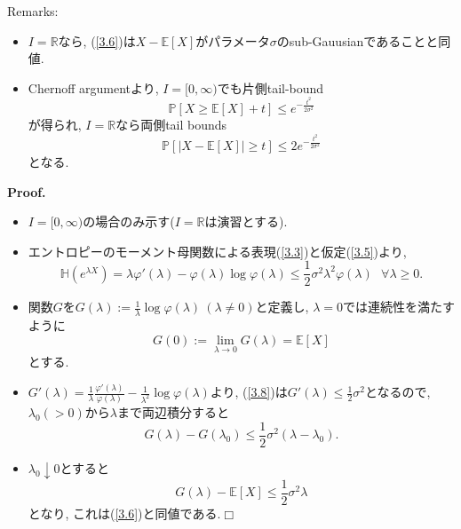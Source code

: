 \documentclass[aspectratio=169, dvipdfmx]{beamer}
\def\qed{\hfill $\Box$}
\newcommand{\ex}{\mathbb{E}}
\begin{document}
\begin{frame}{}
Remarks:
\begin{itemize}
    \item $I = \mathbb{R}$なら, (\ref{3.6})は$X-\ex[X]$がパラメータ$\sigma$のsub-Gauusianであることと同値.
    \item Chernoff argumentより, $I = [0, \infty)$でも片側tail-bound
    \[ \mathbb{P}[X \ge \ex[X]+t] \le e^{-\frac{t^2}{2\sigma^2}} \tag{3.7}\label{3.7}\]
    が得られ, $I=\mathbb{R}$なら両側tail bounds
    \[ \mathbb{P}[|X-\ex[X]|\ge t] \le 2e^{-\frac{t^2}{2\sigma^2}}\]
    となる.
\end{itemize}
\end{frame}

\begin{frame}{}{} 
{\bf Proof.}
\begin{itemize}
    \item $I = [0,\infty)$の場合のみ示す($I=\mathbb{R}$は演習とする).
    \item エントロピーのモーメント母関数による表現(\ref{3.3})と仮定(\ref{3.5})より,
    \[\mathbb{H}(e^{\lambda X}) = \lambda \varphi'(\lambda) - \varphi(\lambda)\log\varphi(\lambda)\le\frac{1}{2}\sigma^2\lambda^2\varphi(\lambda) \ \ \ \forall \lambda \ge 0.\tag{3.8}\label{3.8} \]
    \item 関数$G$を$G(\lambda):= \frac{1}{\lambda}\log\varphi(\lambda)\ (\lambda\ne 0)$と定義し, $\lambda=0$では連続性を満たすように
    \[ G(0):= \lim_{\lambda \to 0}G(\lambda) = \ex[X] \tag{3.9}\label{3.9}\]
    とする.
    \item $G'(\lambda) = \frac{1}{\lambda}\frac{\varphi'(\lambda)}{\varphi(\lambda)}-\frac{1}{\lambda^2}\log\varphi(\lambda)$より, (\ref{3.8})は$G'(\lambda) \le \frac{1}{2}\sigma^2$となるので, $\lambda_0(>0)$から$\lambda$まで両辺積分すると
    \[ G(\lambda) - G(\lambda_0) \le \frac{1}{2}\sigma^2(\lambda-\lambda_0). \]
    \item $\lambda_0 \downarrow 0$とすると
    \[ G(\lambda) - \ex[X] \le \frac{1}{2}\sigma^2\lambda \]
    となり, これは(\ref{3.6})と同値である.\qed
\end{itemize}
\end{frame}
\end{document}
